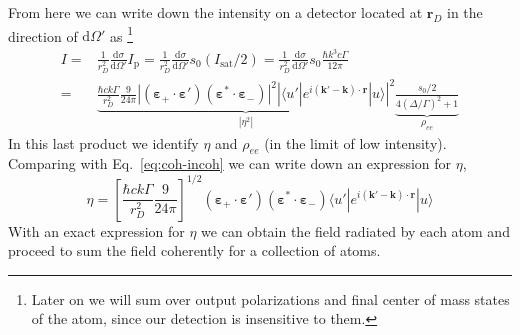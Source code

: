 \documentclass[11pt,letter]{article}
\newcommand{\bv}[1]{\ensuremath{\bm{#1}}}
\begin{document}
From here we can write down the intensity on a detector located at $\bv{r}_{D}$
in the direction of $\mathrm{d} \Omega'$ as \footnote{Later on we will sum over
output polarizations and final center of mass states of the atom, since our
detection is insensitive to them.}
\begin{equation}
\begin{split}
I  =& \frac{1}{r_{D}^{2}} \frac{ \mathrm{d} \sigma } { \mathrm{d} \Omega'}
      I_{\mathrm{p}}  
   =  \frac{1}{r_{D}^{2}} \frac{ \mathrm{d} \sigma } { \mathrm{d} \Omega'}
      s_{0} ( I_{\mathrm{sat}} / 2 )  
   =  \frac{1}{r_{D}^{2}} \frac{ \mathrm{d} \sigma } { \mathrm{d} \Omega'}
      s_{0} \frac{ \hbar k^{3} c \Gamma } { 12 \pi }  
   \\ 
   =&  \underbrace{ \frac{\hbar c k \Gamma}{r_{D}^{2}}  
    \frac{9}{24\pi} 
        |(\bv{\varepsilon}_{+}\cdot \bv{\varepsilon}' )
                       (\bv{\varepsilon}^{*}\cdot \bv{\varepsilon}_{-} ) |^{2}
    \left|
      \langle u' | e^{i(\bv{k}'-\bv{k}) \cdot\bv{r}} | u  \rangle
  \right| ^{2} }_{ |\eta^{2}| } 
   \underbrace{
     \frac{ s_{0}/2   }
        { 4(\Delta/\Gamma)^{2} + 1 } }_{\rho_{ee} } 
\end{split}
\end{equation}
In this last product we identify $\eta$ and $\rho_{ee}$ (in the limit of
low intensity). Comparing with Eq.~\ref{eq:coh-incoh} we can write down an
expression for $\eta$, 
\begin{equation}
  \eta = \left[ \frac{\hbar c k \Gamma}{r_{D}^{2}}  
    \frac{9}{24\pi} \right]^{1/2} 
        (\bv{\varepsilon}_{+}\cdot \bv{\varepsilon}' )
                       (\bv{\varepsilon}^{*}\cdot \bv{\varepsilon}_{-} ) 
      \langle u' | e^{i(\bv{k}'-\bv{k}) \cdot\bv{r}} | u  \rangle
\end{equation}
With an exact expression for $\eta$ we can obtain the field radiated by each
atom and proceed to sum the field coherently for a collection of atoms. 
\end{document}
